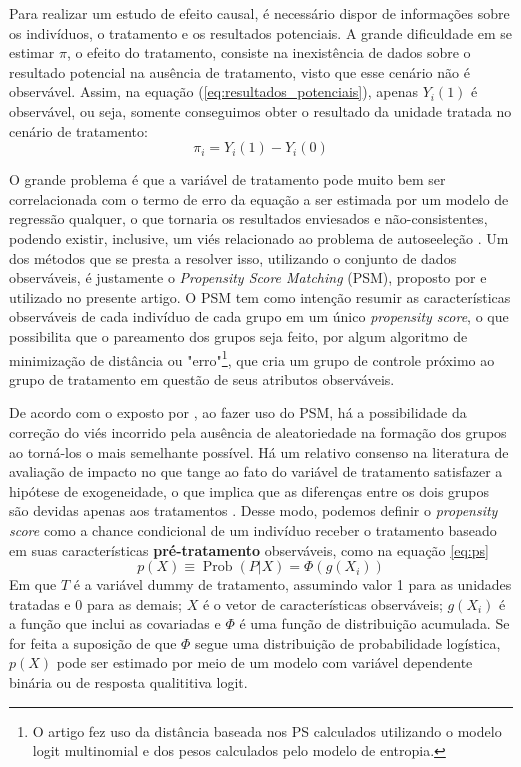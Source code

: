 Para realizar um estudo de efeito causal, é necessário dispor de informações sobre os indivíduos, o tratamento e os resultados potenciais. A grande dificuldade em se estimar $\pi$, o efeito do tratamento, consiste na inexistência de dados sobre o resultado potencial na ausência de tratamento, visto que esse cenário não é observável. Assim, na equação (\ref{eq:resultados_potenciais}), apenas $Y_i(1)$ é observável, ou seja, somente conseguimos obter o resultado da unidade tratada no cenário de tratamento:
\begin{equation} \label{eq:resultados_potenciais} \tag{3.1.2}
\pi_i = Y_i(1) - Y_i(0)
\end{equation}

O grande problema é que a variável de tratamento pode muito bem ser correlacionada com o termo de erro da equação a ser estimada por um modelo de regressão qualquer, o que tornaria os resultados enviesados e não-consistentes, podendo existir, inclusive, um viés relacionado ao problema de autoseeleção \cite{Heckman1979}. Um dos métodos que se presta a resolver isso, utilizando o conjunto de dados observáveis, é justamente o \textit{Propensity Score Matching} (PSM), proposto por  e utilizado no presente artigo. O PSM tem como intenção resumir as características observáveis de cada indivíduo de cada grupo em um único \textit{propensity score}, o que possibilita que o pareamento dos grupos seja feito, por algum algoritmo de minimização de distância ou "erro"\footnote{O artigo fez uso da distância baseada nos PS calculados utilizando o modelo logit multinomial e dos pesos calculados pelo modelo de entropia.}, que cria um grupo de controle próximo ao grupo de tratamento em questão de seus atributos observáveis.

De acordo com o exposto por , ao fazer uso do PSM, há a possibilidade da correção do viés incorrido pela ausência de aleatoriedade na formação dos grupos ao torná-los o mais semelhante possível. Há um relativo consenso na literatura de avaliação de impacto no que tange ao fato do variável de tratamento satisfazer a hipótese de exogeneidade, o que implica que as diferenças entre os dois grupos são devidas apenas aos tratamentos \cite{Caliendo2008}. Desse modo, podemos definir o \textit{propensity score} como a chance condicional de um indivíduo receber o tratamento baseado em suas características \textbf{pré-tratamento} observáveis, como na equação \ref{eq:ps} 
\begin{equation} \label{eq:ps} \tag{3.1.3}
p(X) \equiv \operatorname{Prob}(P|X) = \Phi(g(X_i))
\end{equation}
Em que $T$ é a variável dummy de tratamento, assumindo valor 1 para as unidades tratadas e 0 para as demais; $X$ é o vetor de características observáveis; $g(X_i)$ é a função que inclui as covariadas e $\Phi$ é uma função de distribuição acumulada. Se for feita a suposição de que $\Phi$ segue uma distribuição de probabilidade logística, $p(X)$ pode ser estimado por meio de um modelo com variável dependente binária ou de resposta qualititiva logit.

